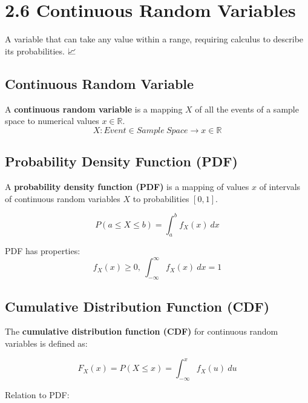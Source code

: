 \documentclass[
  letterpaper,
  DIV=11,
  numbers=noendperiod]{scrreprt}
\begin{document}
\chapter{2.6 Continuous Random
Variables}\label{continuous-random-variables}

\begin{tcolorbox}[enhanced jigsaw, arc=.35mm, toprule=.15mm, leftrule=.75mm, colback=white, left=2mm, colframe=quarto-callout-note-color-frame, rightrule=.15mm, opacityback=0, breakable, bottomrule=.15mm]

A variable that can take any value within a range, requiring calculus to
describe its probabilities. 📈

\end{tcolorbox}

\section{Continuous Random Variable}\label{continuous-random-variable}

A \textbf{continuous random variable} is a mapping \(X\) of all the
events of a sample space to numerical values \(x \in \mathbb{R}\). \[ 
X: Event \in Sample \ Space \to x \in \mathbb{R} 
\]

\section{Probability Density Function
(PDF)}\label{probability-density-function-pdf}

A \textbf{probability density function (PDF)} is a mapping of values
\(x\) of intervals of continuous random variables \(X\) to probabilities
\([0,1]\).

\[ 
P(a \leq X \leq b) = \int_{a}^{b} f_{X}(x) \ dx 
\]

PDF has properties: \[
f_{X}(x) \geq 0, \ \int_{-\infty}^{\infty} f_{X}(x) \ dx = 1
\]

\section{Cumulative Distribution Function
(CDF)}\label{cumulative-distribution-function-cdf-1}

The \textbf{cumulative distribution function (CDF)} for continuous
random variables is defined as:

\[ F_{X}(x) = P(X \leq x) = \int_{-\infty}^{x} f_{X}(u) \ du \]

Relation to PDF:
\end{document}
